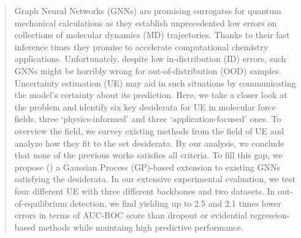 \documentclass{article}
\theoremstyle{plain}
\theoremstyle{definition}
\theoremstyle{remark}
\begin{document}



\printAffiliationsAndNotice{}  %

\begin{abstract}

Graph Neural Networks (GNNs) are promising surrogates for quantum mechanical calculations as they establish unprecedented low errors on collections of molecular dynamics (MD) trajectories.
Thanks to their fast inference times they promise to accelerate computational chemistry applications.
Unfortunately, despite low in-distribution (ID) errors, such GNNs might be horribly wrong for out-of-distribution (OOD) samples.
Uncertainty estimation (UE) may aid in such situations by communicating the model's certainty about its prediction.
Here, we take a closer look at the problem and identify six key desiderata for UE in molecular force fields, three `physics-informed' and three `application-focused' ones.
To overview the field, we survey existing methods from the field of UE and analyze how they fit to the set desiderata.
By our analysis, we conclude that none of the previous works satisfies all criteria.
To fill this gap, we propose \ours{} (\oursacro{}) a Gaussian Process (GP)-based extension to existing GNNs satisfying the desiderata.
In our extensive experimental evaluation, we test four different UE with three different backbones and two datasets.
In out-of-equilibrium detection, we find \oursacro{} yielding up to 2.5 and 2.1 times lower errors in terms of AUC-ROC score than dropout or evidential regression-based methods while maintaing high predictive performance.
\end{abstract}














\newpage
\appendix
\onecolumn

\end{document}

